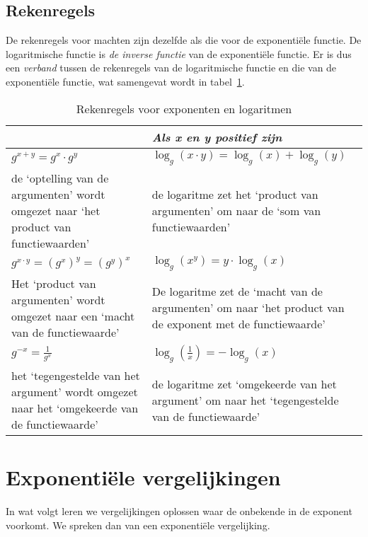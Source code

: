 \subsection{Rekenregels}

De rekenregels voor machten zijn dezelfde als die voor de
exponenti\"{e}le functie. De logaritmische functie is \emph{de inverse functie} van de exponenti\"{e}le
functie. Er is dus een \emph{verband} tussen de
rekenregels van de logaritmische functie en die van de exponenti\"{e}le
functie, wat samengevat wordt in tabel~\ref{tbl:logexpverband}. 
\begin{table}[htbp]
    \centering
    \caption{Rekenregels voor exponenten en logaritmen}
       \begin{tabular}{p{5cm}|p{5.5cm}}
    \toprule
     & \emph{Als x en y positief zijn}  \\
    \midrule
    $g^{x+y}=g^{x}\cdot g^{y}$ & $\log_{g}(x\cdot y)=\log_{g}(x)+\log_{g}(y)$  \\  
    de `optelling van de argumenten' wordt omgezet naar `het product
    van functiewaarden' & de logaritme zet het
    `product van argumenten' om naar de  `som van
    functiewaarden'  \\     \midrule
    $g^{x\cdot y}=\left(g^{x}\right)^{y}=\left(g^{y}\right)^{x}$ & $\log_{g}(x^{y})=y\cdot \log_{g}(x)$
    \\  
    Het `product van argumenten' wordt omgezet naar een `macht
    van de functiewaarde' &
    De logaritme zet de ‘macht van de argumenten’ om naar `het
    product van de exponent met de functiewaarde'\\
    \midrule
   
    $g^{-x}=\frac{1}{g^{x}}$ & $\log_{g}\left(\frac{1}{x}\right)=-\log_{g}(x)$\\      %
    het `tegengestelde van het argument' wordt omgezet naar het
    `omgekeerde van de functiewaarde' & de logaritme zet ‘omgekeerde
    van het argument’ om naar  het  `tegengestelde van de
    functiewaarde'  \\
    \bottomrule
\end{tabular}

    \label{tbl:logexpverband}
\end{table}

\newpage
\section{Exponenti\"{e}le vergelijkingen}
\label{sec:exp_vgl}
In wat volgt leren we vergelijkingen oplossen waar  de onbekende
in de exponent voorkomt. We spreken dan van een exponenti\"{e}le
vergelijking. 

